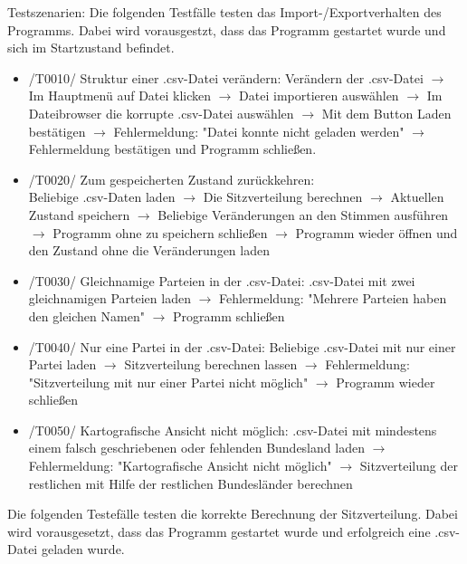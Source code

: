\documentclass[10pt,a4paper]{article}
\begin{document}
Testszenarien:
Die folgenden Testfälle testen das Import-/Exportverhalten des Programms. Dabei wird vorausgestzt, dass das Programm gestartet wurde und sich im Startzustand befindet. 
\begin{itemize}
	\item /T0010/ Struktur einer .csv-Datei verändern: \newline
	Verändern der .csv-Datei $\rightarrow$ Im Hauptmenü auf Datei klicken $\rightarrow$ Datei importieren auswählen $\rightarrow$ Im Dateibrowser die korrupte .csv-Datei auswählen $\rightarrow$ Mit dem Button Laden bestätigen $\rightarrow$ Fehlermeldung: "Datei konnte nicht geladen werden" $\rightarrow$ Fehlermeldung bestätigen und Programm schließen.
	\item /T0020/ Zum gespeicherten Zustand zurückkehren: \\
	Beliebige .csv-Daten laden $\rightarrow$ Die Sitzverteilung berechnen $\rightarrow$ Aktuellen Zustand speichern $\rightarrow$ Beliebige Veränderungen an den Stimmen ausführen $\rightarrow$ Programm ohne zu speichern schließen $\rightarrow$ Programm wieder öffnen und den Zustand ohne die Veränderungen laden
	\item /T0030/ Gleichnamige Parteien in der .csv-Datei: \newline
	.csv-Datei mit zwei gleichnamigen Parteien laden $\rightarrow$ Fehlermeldung: "Mehrere Parteien haben den gleichen Namen" $\rightarrow$ Programm schließen
	\item /T0040/ Nur eine Partei in der .csv-Datei: \newline
	Beliebige .csv-Datei mit nur einer Partei laden $\rightarrow$ Sitzverteilung berechnen lassen $\rightarrow$ Fehlermeldung: "Sitzverteilung mit nur einer Partei nicht möglich" $\rightarrow$ Programm wieder schließen
	\item /T0050/ Kartografische Ansicht nicht möglich: \newline
	.csv-Datei mit mindestens einem falsch geschriebenen oder fehlenden Bundesland laden $\rightarrow$ Fehlermeldung: "Kartografische Ansicht nicht möglich" $\rightarrow$ Sitzverteilung der restlichen mit Hilfe der restlichen Bundesländer berechnen\newline
\end{itemize}
Die folgenden Testefälle testen die korrekte Berechnung der Sitzverteilung. Dabei wird vorausgesetzt, dass  das Programm gestartet wurde und erfolgreich eine .csv-Datei geladen wurde.
\end{document}
